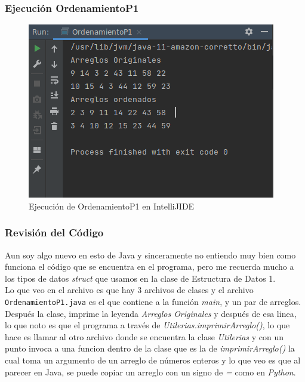 \documentclass{article}
\begin{document}
			\subsubsection{Ejecución OrdenamientoP1}
			
			\begin{figure}[H]
				\centering
				\includegraphics[scale = 0.6]{images/e4-1}
				\caption{Ejecución de OrdenamientoP1 en IntelliJIDE}
			\end{figure}
		
			\subsubsection{Revisión del Código}
			
			 Aun soy algo nuevo en esto de Java y sinceramente no entiendo muy bien como funciona el código que se encuentra en el programa, pero me recuerda mucho a los tipos de datos \emph{struct} que usamos en la clase de Estructura de Datos 1.\\
			
			Lo que veo en el archivo es que hay 3 archivos de clases y el archivo \\ \verb*|OrdenamientoP1.java| es el que contiene a la función \emph{main}, y un par de arreglos.\\
			
			Después la clase, imprime la leyenda \emph{Arreglos Originales} y después de esa linea, lo que noto es que el programa a través de \emph{Utilerias.imprimirArreglo()}, lo que hace es llamar al otro archivo donde se encuentra la clase \emph{Utilerias} y con un punto invoca a una funcion dentro de la clase que es la de \emph{imprimirArreglo()} la cual toma un argumento de un arreglo de números enteros y lo que veo es que al parecer en Java, se puede copiar un arreglo con un signo de \emph{=} como en \emph{Python}.\\
			
\end{document}
